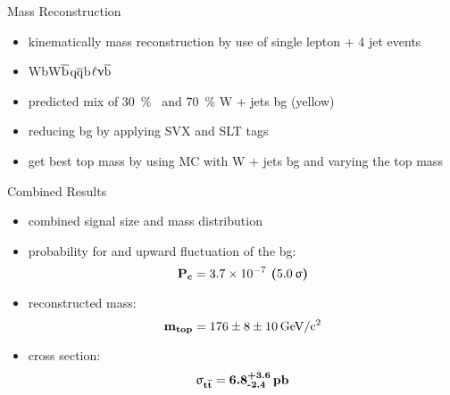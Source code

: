 \begin{frame}{Mass Reconstruction}
	
	\begin{itemize}\itemfill
		\item kinematically mass reconstruction by use of single lepton + 4 jet events
		\item \ttb\ch{->}WbW$\overline{\z{b}}$\ch{->}$\z{q}\overline{\z{q}}$b$\ell\upnu\overline{\z{b}}$
		\item predicted mix of \SI{30}{\%} \ttb\ and \SI{70}{\%} W + jets bg (yellow)
		\item reducing bg by applying SVX and SLT tags
		\item get best top mass by using MC with W + jets bg and varying the top mass
	\end{itemize}
	
	\begin{figure}\vspace*{-5pt}
		\centering
	\end{figure}\vspace*{-20pt}
	
\end{frame}
\begin{frame}{Combined Results}
	
	\begin{itemize}\itemfill
		\item combined signal size and mass distribution
		\item probability for and upward fluctuation of the bg: 
		{\begin{equation*} \z{\textbf{P}}_{\z{\textbf{c}}} = \textbf{\SI{3.7e-7}{} (\SI{5.0}{\upsigma})} \end{equation*}}
		\item reconstructed mass:
		{\begin{equation*} \z{\textbf{m}}_{\z{\textbf{top}}} = \textbf{\SI[parse-numbers=false]{176\pm8\pm10}{\giga\electronvolt\per c^2}} \end{equation*}}
		\item cross section:
		{\begin{equation*} \mathbf{\upsigma}_{\z{\textbf{t}}\overline{\z{\textbf{t}}}} = \textbf{6.8}^{\textbf{+3.6}}_{\textbf{-2.4}}\, \z{\textbf{pb}} \end{equation*}}
	\end{itemize}
	
\end{frame}

